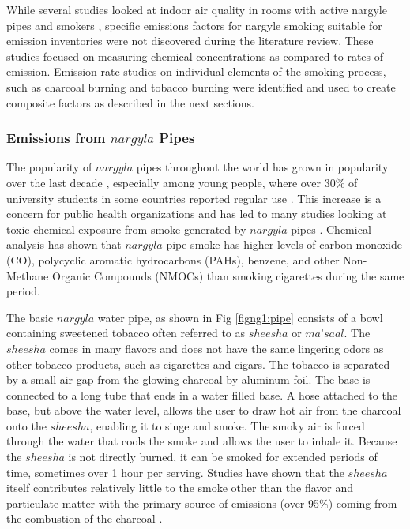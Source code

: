 While several studies looked at indoor air quality in rooms with active nargyle pipes and smokers \citep{Fromme2009, Moon2015, Mulla2015}, specific emissions factors for nargyle smoking suitable for emission inventories were not discovered during the literature review. These studies focused on measuring chemical concentrations as compared to rates of emission. Emission rate studies on individual elements of the smoking process, such as charcoal burning and tobacco burning were identified and used to create composite factors as described in the next sections. 

\subsubsection{Emissions from $nargyla$ Pipes}
The popularity of $nargyla$ pipes throughout the world has grown in popularity over the last decade \citep{Chaouachi2009, Monzer2008}, especially among young people, where over 30\% of university students in some countries reported regular use \citep{Eissenberg2009}. This increase is a concern for public health organizations and has led to many studies looking at toxic chemical exposure from smoke generated by $nargyla$ pipes \citep{Daher2010, Eissenberg2009, Monzer2008, Sepetdjian2010, Shihadeh2005}.  Chemical analysis has shown that $nargyla$ pipe smoke has higher levels of carbon monoxide (CO), polycyclic aromatic hydrocarbons (PAHs), benzene, and other Non-Methane Organic Compounds (NMOCs) than smoking cigarettes during the same period.

The basic $nargyla$ water pipe, as shown in Fig \ref{figng1:pipe} consists of a bowl containing sweetened tobacco often referred to as $sheesha$ or $ma’saal$.  The $sheesha$ comes in many flavors and does not have the same lingering odors as other tobacco products, such as cigarettes and cigars.  The tobacco is separated by a small air gap from the glowing charcoal by aluminum foil.  The base is connected to a long tube that ends in a water filled base.  A hose attached to the base, but above the water level, allows the user to draw hot air from the charcoal onto the $sheesha$, enabling it to singe and smoke.  The smoky air is forced through the water that cools the smoke and allows the user to inhale it.  Because the $sheesha$ is not directly burned, it can be smoked for extended periods of time, sometimes over 1 hour per serving.  Studies have shown that the $sheesha$ itself contributes relatively little to the smoke other than the flavor and particulate matter with the primary source of emissions (over 95\%) coming from the combustion of the charcoal \citep{Sepetdjian2010}.

